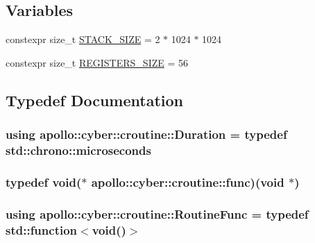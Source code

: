 \subsection*{Variables}
\begin{DoxyCompactItemize}
\item 
constexpr size\-\_\-t \hyperlink{namespaceapollo_1_1cyber_1_1croutine_ac645ea6350d95f21980e311868f72557}{S\-T\-A\-C\-K\-\_\-\-S\-I\-Z\-E} = 2 $\ast$ 1024 $\ast$ 1024
\item 
constexpr size\-\_\-t \hyperlink{namespaceapollo_1_1cyber_1_1croutine_aa975ad5018ccbbb80b0cac19c50dc39f}{R\-E\-G\-I\-S\-T\-E\-R\-S\-\_\-\-S\-I\-Z\-E} = 56
\end{DoxyCompactItemize}


\subsection{Typedef Documentation}
\hypertarget{namespaceapollo_1_1cyber_1_1croutine_aae31aee73e46be40ab635496b4d9d1e2}{
\subsubsection[{Duration}]{\setlength{\rightskip}{0pt plus 5cm}using {\bf apollo\-::cyber\-::croutine\-::\-Duration} = typedef std\-::chrono\-::microseconds}}\label{namespaceapollo_1_1cyber_1_1croutine_aae31aee73e46be40ab635496b4d9d1e2}
\hypertarget{namespaceapollo_1_1cyber_1_1croutine_a10b1486257a9f9174f905a6f4a54523f}{
\subsubsection[{func}]{\setlength{\rightskip}{0pt plus 5cm}typedef void($\ast$ apollo\-::cyber\-::croutine\-::func)(void $\ast$)}}\label{namespaceapollo_1_1cyber_1_1croutine_a10b1486257a9f9174f905a6f4a54523f}
\hypertarget{namespaceapollo_1_1cyber_1_1croutine_a5c1d994c8a08504b270fd8c4ba57d282}{
\subsubsection[{Routine\-Func}]{\setlength{\rightskip}{0pt plus 5cm}using {\bf apollo\-::cyber\-::croutine\-::\-Routine\-Func} = typedef std\-::function$<$void()$>$}}\label{namespaceapollo_1_1cyber_1_1croutine_a5c1d994c8a08504b270fd8c4ba57d282}


